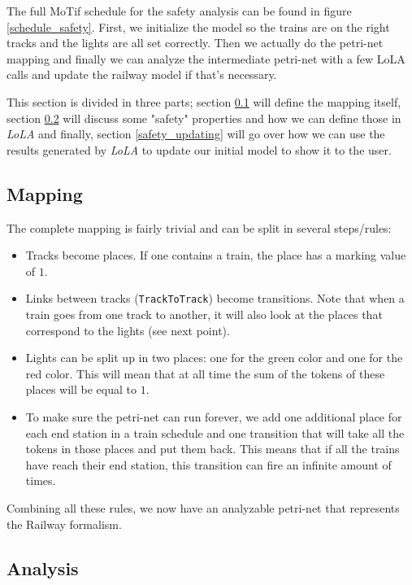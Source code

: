 \documentclass{article}
\begin{document}
The full MoTif schedule for the safety analysis can be found in figure \ref{schedule_safety}. First, we initialize the model so the trains are on the right tracks and the lights are all set correctly. Then we actually do the petri-net mapping and finally we can analyze the intermediate petri-net with a few LoLA calls and update the railway model if that's necessary.

This section is divided in three parts; section \ref{petri-net_mapping} will define the mapping itself, section \ref{safety_analysis} will discuss some "safety" properties and how we can define those in \textit{LoLA} and finally, section \ref{safety_updating} will go over how we can use the results generated by \textit{LoLA} to update our initial model to show it to the user.

\subsection{Mapping}
\label{petri-net_mapping}

The complete mapping is fairly trivial and can be split in several steps/rules:

\begin{itemize}
    \item Tracks become places. If one contains a train, the place has a marking value of $1$.
    \item Links between tracks (\texttt{TrackToTrack}) become transitions. Note that when a train goes from one track to another, it will also look at the places that correspond to the lights (see next point).
    \item Lights can be split up in two places: one for the green color and one for the red color. This will mean that at all time the sum of the tokens of these places will be equal to $1$.
    \item To make sure the petri-net can run forever, we add one additional place for each end station in a train schedule and one transition that will take all the tokens in those places and put them back. This means that if all the trains have reach their end station, this transition can fire an infinite amount of times.
\end{itemize}

Combining all these rules, we now have an analyzable petri-net that represents the Railway formalism.

\subsection{Analysis}
\label{safety_analysis}
\end{document}
